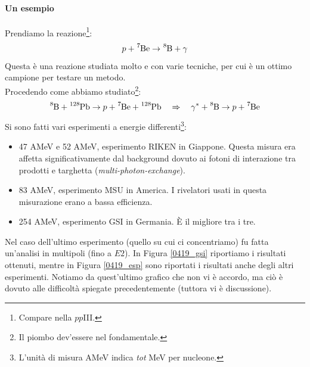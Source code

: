\paragraph{Un esempio} Prendiamo la reazione\footnote{Compare nella $pp$III.}:
$$p+\ce{^7Be} \to \ce{^8B}+\gamma$$
Questa è una reazione studiata molto e con varie tecniche, per cui è un ottimo campione per testare un metodo.\\
Procedendo come abbiamo studiato\footnote{Il piombo dev'essere nel fondamentale.}:%
$$\ce{^8B} + \ce{^{128}Pb} \to p +  \ce{^7Be} + \ce{^{128}Pb} \quad \Rightarrow \quad \gamma^* + \ce{^8B} \to p+ \ce{^7Be}$$
Si sono fatti vari esperimenti a energie differenti\footnote{L'unità di misura AMeV indica \textit{tot} MeV per nucleone.}:
\begin{itemize}
	\item 47 AMeV e 52 AMeV, esperimento RIKEN in Giappone. Questa misura era affetta significativamente dal background dovuto ai fotoni di interazione tra prodotti e targhetta (\textit{multi-photon-exchange}).
	\item 83 AMeV, esperimento MSU in America. I rivelatori usati in questa misurazione erano a bassa efficienza.
	\item 254 AMeV, esperimento GSI in Germania. È il migliore tra i tre.
\end{itemize}
\noindent Nel caso dell'ultimo esperimento (quello su cui ci concentriamo) fu fatta un'analisi in multipoli (fino a $E2$). In Figura \ref{0419_gsi} riportiamo i risultati ottenuti, mentre in Figura \ref{0419_esp} sono riportati i risultati anche degli altri esperimenti. Notiamo da quest'ultimo grafico che non vi è accordo, ma ciò è dovuto alle difficoltà spiegate precedentemente (tuttora vi è discussione).

